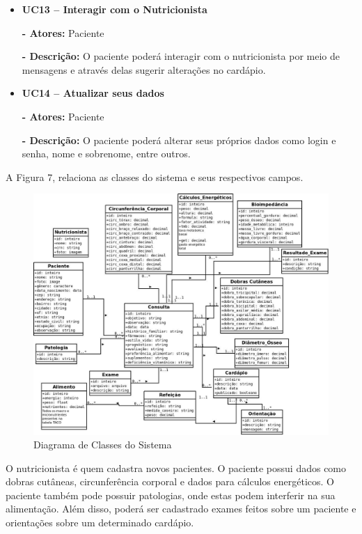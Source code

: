 \documentclass[
	12pt,				%
    oneside,			%
	a4paper,			%
	english,			%
	french,				%
	spanish,			%
	brazil,				%
	]{abntex2}
\begin{document}
\begin{itemize}
\item \textbf{UC13 – Interagir com o Nutricionista}

\textbf{- Atores:} Paciente

\textbf{- Descrição:} O paciente poderá interagir com o nutricionista por meio de mensagens e através delas sugerir alterações no cardápio.

\item \textbf{UC14 – Atualizar seus dados}

\textbf{- Atores:} Paciente

\textbf{- Descrição:} O paciente poderá alterar seus próprios dados como login e senha, nome e sobrenome, entre outros.

\end{itemize}

A Figura 7, relaciona as classes do sistema e seus respectivos campos.

\begin{figure} [hbt] 
\begin{center}
\includegraphics[width=1\textwidth]{bd-sistema.jpeg}
\end{center}
\label{diagClass1} 
\caption{Diagrama de Classes do Sistema}
\end{figure}

O nutricionista é quem cadastra novos pacientes. O paciente possui dados como
dobras cutâneas, circunferência corporal e dados para cálculos energéticos. O
paciente também pode possuir patologias, onde estas podem interferir na sua
alimentação. Além disso, poderá ser cadastrado exames feitos sobre um paciente e
orientações sobre um determinado cardápio. 
\end{document}
